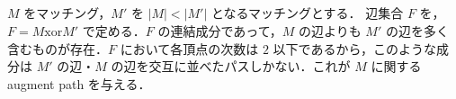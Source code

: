 \subsection{}
$M$ をマッチング，$M'$ を $|M| < |M'|$ となるマッチングとする．
辺集合 $F$ を，$F = M \mathrm{xor} M'$ で定める．$F$ の連結成分であって，$M$ の辺よりも
$M'$ の辺を多く含むものが存在．$F$ において各頂点の次数は $2$ 以下であるから，このような成分は
$M'$ の辺・$M$ の辺を交互に並べたパスしかない．これが $M$ に関する augment path を与える．
